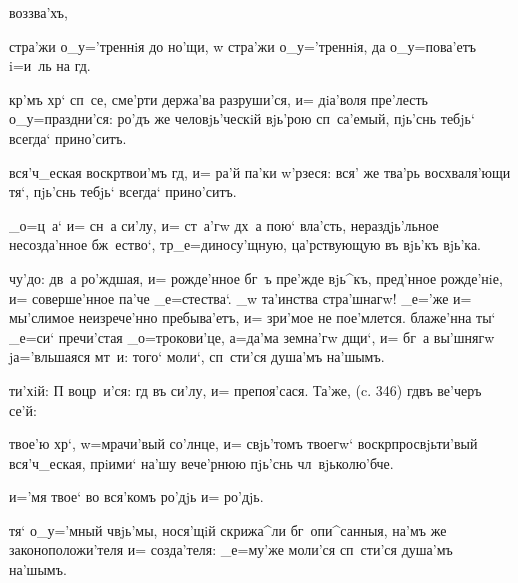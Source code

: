 
  воззва'хъ, 

 стра'жи о_у='треннiя до но'щи, w\т 
стра'жи о_у='треннiя, да о_у=пова'етъ i=и~ль на гд.

 кр'мъ хр` сп~се, сме'рти держа'ва 
разруши'ся, и= дiа'воля пре'лесть о_у=праздни'ся: ро'дъ 
же человjь'ческiй вjь'рою сп~са'емый, пjь'снь тебjь` 
всегда` прино'ситъ.

 вся'ч_еская воскр твои'мъ 
гд, и= ра'й па'ки w'рзеся: вся' же тва'рь 
восхваля'ющи тя`, пjь'снь тебjь` всегда` прино'ситъ.

 _о=ц~а` и= сн~а си'лу, и= ст~а'гw дх~а 
пою` вла'сть, нераздjь'льное несозда'нное бж~ество`, 
тр _е=диносу'щную, ца'рствующую въ вjь'къ вjь'ка.


 чу'до: дв~а ро'ждшая, и= рожде'нное бг~ъ 
пре'жде вjь^къ, пред'нное рожде'нiе, и= 
соверше'нное па'че _е=стества`. _w та'инства стра'шнагw! 
_е='же и= мы'слимое неизрече'нно пребыва'етъ, и= зри'мое 
не пое'млется. блаже'нна ты` _е=си` пречи'стая 
_о=трокови'це, а=да'ма земна'гw дщи`, и= бг~а вы'шнягw 
jа='вльшаяся мт~и: того` моли`, сп~сти'ся душа'мъ 
на'шымъ.

  ти'хiй: П   воцр~и'ся:    гд 
въ си'лу, и= препоя'сася. Та'же, (c. 346)  
гд въ ве'черъ се'й: 

 твое'ю хр`, w=мрачи'вый со'лнце, и= 
свjь'томъ твоегw` воскр просвjьти'вый вся'ч_еская, 
прiими` на'шу вече'рнюю пjь'снь чл~вjьколю'бче.


  и='мя твое` во вся'комъ ро'дjь и= 
ро'дjь.

 тя` о_у='мный ч вjь'мы, нося'щiй 
скрижа^ли бг~опи^санныя, на'мъ же законоположи'теля и= 
созда'теля: _е=му'же моли'ся сп~сти'ся душа'мъ на'шымъ.

